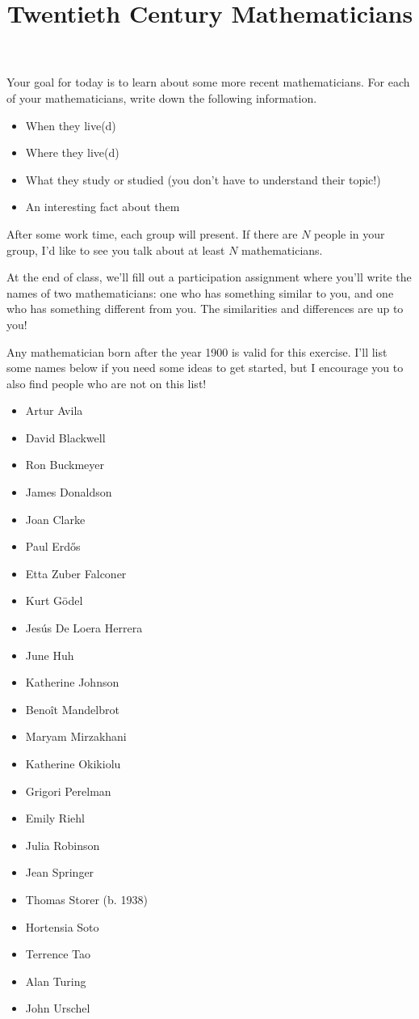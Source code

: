\documentclass[handout,nooutcomes]{ximera}
\title{Twentieth Century Mathematicians}
\begin{document}
\begin{abstract}
    
\end{abstract}
\maketitle

Your goal for today is to learn about some more recent mathematicians. For each 
of your mathematicians, write down the following information.
\begin{itemize}
\item When they live(d)
\item Where they live(d)
\item What they study or studied (you don't have to understand their topic!)
\item An interesting fact about them
\end{itemize}

After some work time, each group will present. If there are $N$ people in your group, 
I'd like to see you talk about at least $N$ mathematicians.

At the end of class, we'll fill out a participation assignment where you'll write the 
names of two mathematicians: one who has something similar to you, and one who has 
something different from you. The similarities and differences are up to you!

Any mathematician born after the year 1900 is valid for this exercise. I'll list some 
names below if you need some ideas to get started, but I encourage you to also find people 
who are not on this list!
	
  \begin{itemize}
\item Artur Avila
\item David Blackwell
\item Ron Buckmeyer
\item James Donaldson
\item Joan Clarke
\item Paul Erd\H{o}s
\item Etta Zuber Falconer
\item Kurt G\"{o}del
\item Jes\'{u}s De Loera Herrera
\item June Huh
\item Katherine Johnson
\item Beno\^{i}t Mandelbrot
\item Maryam Mirzakhani
\item Katherine Okikiolu
\item Grigori Perelman
\item Emily Riehl
\item Julia Robinson
\item Jean Springer
\item Thomas Storer (b. 1938)
\item Hortensia Soto
\item Terrence Tao
\item Alan Turing
\item John Urschel
\end{itemize}
\end{document}
